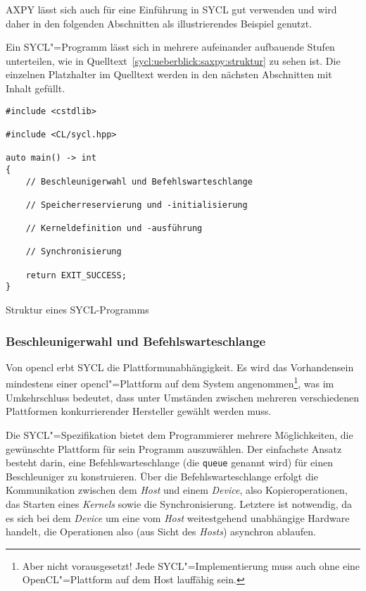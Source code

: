 AXPY lässt sich auch für eine Einführung in SYCL gut verwenden und wird daher in
den folgenden Abschnitten als illustrierendes Beispiel genutzt.

Ein SYCL"=Programm lässt sich in mehrere aufeinander aufbauende Stufen
unterteilen, wie in Quelltext~\ref{sycl:ueberblick:saxpy:struktur} zu sehen ist.
Die einzelnen Platzhalter im Quelltext werden in den nächsten Abschnitten mit
Inhalt gefüllt.

\begin{code}
    \begin{verbatim}
#include <cstdlib>

#include <CL/sycl.hpp>

auto main() -> int
{
    // Beschleunigerwahl und Befehlswarteschlange

    // Speicherreservierung und -initialisierung

    // Kerneldefinition und -ausführung

    // Synchronisierung

    return EXIT_SUCCESS;
}
    \end{verbatim}
    \caption{Struktur eines SYCL-Programms}
    \label{sycl:ueberblick:saxpy:struktur}
\end{code}

\subsubsection{Beschleunigerwahl und Befehlswarteschlange}
\label{sycl:ueberblick:saxpy:queue}

Von \gls{opencl} erbt SYCL die Plattformunabhängigkeit. Es wird das
Vorhandensein mindestens einer \gls{opencl}"=Plattform auf dem System
angenommen\footnote{Aber nicht vorausgesetzt! Jede SYCL"=Implementierung muss
auch ohne eine OpenCL"=Plattform auf dem Host lauffähig sein.}, was im
Umkehrschluss bedeutet, dass unter Umständen zwischen mehreren verschiedenen
Plattformen konkurrierender Hersteller gewählt werden muss. 

Die SYCL"=Spezifikation bietet dem Programmierer mehrere Möglichkeiten, die
gewünschte Plattform für sein Programm auszuwählen. Der einfachste Ansatz
besteht darin, eine Befehlswarteschlange (die \texttt{queue} genannt wird) für
einen Beschleuniger zu konstruieren. Über die Befehlswarteschlange erfolgt die
Kommunikation zwischen dem \textit{Host} und einem \textit{Device}, also
Kopieroperationen, das Starten eines \textit{Kernels} sowie die
Synchronisierung. Letztere ist notwendig, da es sich bei dem \textit{Device}
um eine vom \textit{Host} weitestgehend unabhängige Hardware handelt, die
Operationen also (aus Sicht des \textit{Hosts}) asynchron ablaufen.

